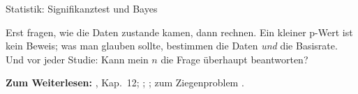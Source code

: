 \begin{handout}{Statistik: Signifikanztest und Bayes}
\begin{merkbox}
Erst fragen, wie die Daten zustande kamen, dann rechnen. Ein kleiner
p-Wert ist kein Beweis; was man glauben sollte, bestimmen die Daten
\emph{und} die Basisrate. Und vor jeder Studie: Kann mein $n$ die Frage
überhaupt beantworten?
\end{merkbox}

\textbf{Zum Weiterlesen:} \textcite{doeringbortz2016}, Kap.~12;
\textcite{wagenmakers2007practical}; \textcite{gigerenzerhoffrage1995};
zum Ziegenproblem \textcite{mhall_krauss2003}.
\end{handout}


